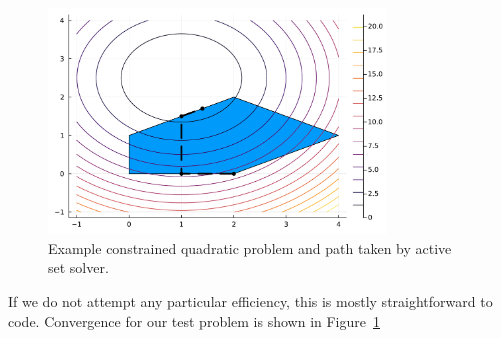 \documentclass[12pt, leqno]{article} %
\begin{document}
\begin{figure}
\begin{center}
\includegraphics[width=0.8\textwidth]{fig/2023-04-28-ex16_3-as.pdf}
\end{center}
\caption{Example constrained quadratic problem and path taken by
  active set solver.}
\label{fig:test-qp-as}
\end{figure}

If we do not attempt any particular efficiency, this is mostly
straightforward to code.  Convergence for our test problem is shown
in Figure~\ref{fig:test-qp-as}
\end{document}
